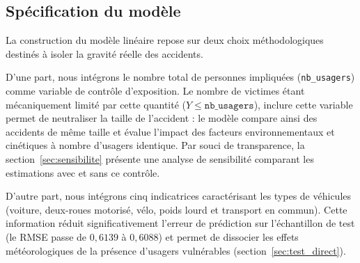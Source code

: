 \documentclass[11pt,a4paper]{article}
\begin{document}
\subsection{Spécification du modèle}
La construction du modèle linéaire repose sur deux choix méthodologiques destinés à isoler la gravité réelle des accidents.

D'une part, nous intégrons le nombre total de personnes impliquées (\texttt{nb\_usagers}) comme variable de contrôle d'exposition. Le nombre de victimes étant mécaniquement limité par cette quantité ($Y \le \texttt{nb\_usagers}$), inclure cette variable permet de neutraliser la taille de l'accident : le modèle compare ainsi des accidents de même taille et évalue l'impact des facteurs environnementaux et cinétiques à nombre d'usagers identique. Par souci de transparence, la section~\ref{sec:sensibilite} présente une analyse de sensibilité comparant les estimations avec et sans ce contrôle.

D'autre part, nous intégrons cinq indicatrices caractérisant les types de véhicules (voiture, deux-roues motorisé, vélo, poids lourd et transport en commun). Cette information réduit significativement l'erreur de prédiction sur l'échantillon de test (le RMSE passe de $0{,}6139$ à $0{,}6088$) et permet de dissocier les effets météorologiques de la présence d'usagers vulnérables (section~\ref{sec:test_direct}).
\end{document}

